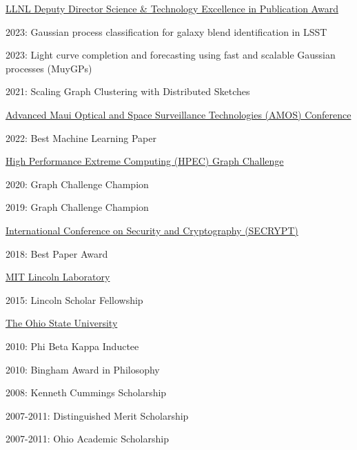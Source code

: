 \href{https://amostech.com/}{LLNL Deputy Director Science \& Technology Excellence in Publication Award}
\begin{innerlist}
  \item[] 2023: Gaussian process classification for galaxy blend identification in LSST
  \item[] 2023: Light curve completion and forecasting using fast and scalable Gaussian processes (MuyGPs)
  \item[] 2021: Scaling Graph Clustering with Distributed Sketches
\end{innerlist}

\halfblankline

\href{https://amostech.com/}{Advanced Maui Optical and Space Surveillance Technologies (AMOS) Conference}
\begin{innerlist}
  \item[] 2022: Best Machine Learning Paper
\end{innerlist}

\halfblankline

\href{https://graphchallenge.mit.edu/champions}{High Performance Extreme Computing (HPEC) Graph Challenge}
\begin{innerlist}
  \item[] 2020: Graph Challenge Champion
  \item[] 2019: Graph Challenge Champion
\end{innerlist}

\halfblankline

\href{http://www.secrypt.icete.org/PreviousAwards.aspx}{International Conference on Security and Cryptography (SECRYPT)}
\begin{innerlist}
  \item[] 2018: Best Paper Award
\end{innerlist}

\halfblankline

\href{http://www.ll.mit.edu}{MIT Lincoln Laboratory}
\begin{innerlist}
  \item[] 2015: Lincoln Scholar Fellowship
\end{innerlist}

\halfblankline

\href{http://www.osu.edu}{The Ohio State University}
\begin{innerlist}
  \item[] 2010: Phi Beta Kappa Inductee
  \item[] 2010: Bingham Award in Philosophy
  \item[] 2008: Kenneth Cummings Scholarship
  \item[] 2007-2011: Distinguished Merit Scholarship
  \item[] 2007-2011: Ohio Academic Scholarship
\end{innerlist}

